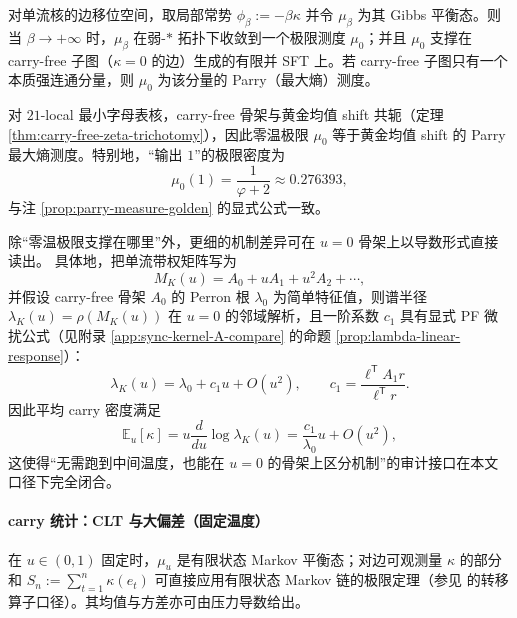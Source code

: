 \begin{theorem}\label{thm:kernel-zero-temp}
对单流核的边移位空间，取局部常势 $\phi_\beta:=-\beta\kappa$ 并令 $\mu_\beta$ 为其 Gibbs 平衡态。则当 $\beta\to+\infty$ 时，$\mu_\beta$ 在弱-$\ast$ 拓扑下收敛到一个极限测度 $\mu_0$；并且 $\mu_0$ 支撑在 carry-free 子图（$\kappa=0$ 的边）生成的有限并 SFT 上。若 carry-free 子图只有一个本质强连通分量，则 $\mu_0$ 为该分量的 Parry（最大熵）测度。
\end{theorem}

\begin{corollary}\label{cor:kernel-21-ground-state}
对 $21$-local 最小字母表核，carry-free 骨架与黄金均值 shift 共轭（定理 \ref{thm:carry-free-zeta-trichotomy}），因此零温极限 $\mu_0$ 等于黄金均值 shift 的 Parry 最大熵测度。特别地，“输出 $1$”的极限密度为
\[
\mu_0(1)=\frac{1}{\varphi+2}\approx 0.276393,
\]
与注 \ref{prop:parry-measure-golden} 的显式公式一致。
\end{corollary}

\begin{remark}[零温谱的“可微指纹”：从 \texorpdfstring{$u=0$}{u=0} 骨架读出一阶响应]\label{rem:kernel-zero-temp-differential-fingerprint}
除“零温极限支撑在哪里”外，更细的机制差异可在 \(u=0\) 骨架上以导数形式直接读出。
具体地，把单流带权矩阵写为
$$
M_K(u)=A_0+uA_1+u^2A_2+\cdots,
$$
并假设 carry-free 骨架 \(A_0\) 的 Perron 根 \(\lambda_0\) 为简单特征值，则谱半径 \(\lambda_K(u)=\rho(M_K(u))\) 在 \(u=0\) 的邻域解析，且一阶系数 \(c_1\) 具有显式 PF 微扰公式（见附录 \ref{app:sync-kernel-A-compare} 的命题 \ref{prop:lambda-linear-response}）：
$$
\lambda_K(u)=\lambda_0+c_1u+O(u^2),
\qquad
c_1=\frac{\ell^{\mathsf T}A_1 r}{\ell^{\mathsf T}r}.
$$
因此平均 carry 密度满足
$$
\mathbb{E}_u[\kappa]
=u\frac{d}{du}\log\lambda_K(u)
=\frac{c_1}{\lambda_0}u+O(u^2),
$$
这使得“无需跑到中间温度，也能在 \(u=0\) 的骨架上区分机制”的审计接口在本文口径下完全闭合。
\end{remark}

\paragraph{carry 统计：CLT 与大偏差（固定温度）}
在 $u\in(0,1)$ 固定时，$\mu_u$ 是有限状态 Markov 平衡态；对边可观测量 $\kappa$ 的部分和
\(
S_n:=\sum_{t=1}^{n}\kappa(e_t)
\)
可直接应用有限状态 Markov 链的极限定理（参见 \cite{Ruelle1978Thermodynamic} 的转移算子口径）。其均值与方差亦可由压力导数给出。

